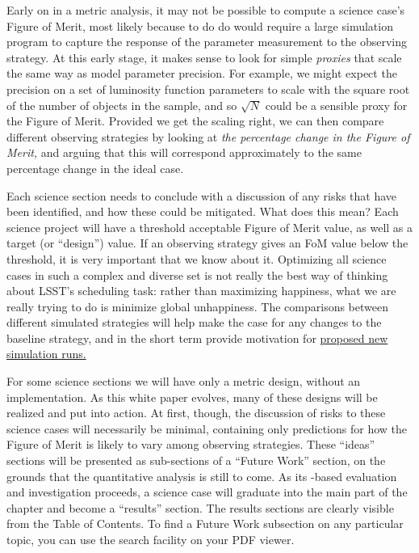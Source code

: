 Early on in a metric analysis, it may not be possible to compute a
science case's Figure of Merit, most likely because to do do would
require a large simulation program to capture the response of the
parameter measurement to the observing strategy. At this early stage, it
makes sense to look for simple {\it proxies} that scale the same way as
model parameter precision. For example, we might expect the precision on
a set of luminosity function  parameters to scale with the square root
of the number of objects in the sample, and so $\sqrt{N}$ could be a
sensible proxy for the Figure of Merit. Provided we get the scaling
right, we can then compare different observing strategies by looking  at
{\it the percentage change in the Figure of Merit,} and arguing that
this will correspond approximately to the same percentage change in the
ideal case.

Each science section needs to conclude with a discussion of any risks
that have been identified, and how these could be mitigated. What does
this mean? Each science project will have a threshold acceptable
Figure of Merit value, as well as a target (or ``design'') value.  If
an observing strategy gives an FoM value below the threshold, it
is very important that we know about it.  Optimizing all science cases
in such a complex and diverse set is not really the best way of
thinking about LSST's scheduling task: rather than maximizing
happiness, what we are really trying to do is minimize global
unhappiness.
The comparisons between different simulated strategies will help make
the case for any changes to the baseline strategy, and in the short term
provide motivation for
\href{https://github.com/LSSTScienceCollaborations/ObservingStrategy/blob/master/opsim/README.md}{proposed
new \OpSim simulation runs.}

For some science sections we will have only a metric design, without an
implementation. As this white paper  evolves, many of these designs will
be realized and put into action. At first, though, the discussion of
risks to these science cases will necessarily be minimal, containing
only predictions for how the Figure of Merit is likely to vary among
observing strategies. These ``ideas'' sections will be presented as
sub-sections of a ``Future Work'' section, on the grounds that the
quantitative analysis is still to come. As its \MAF-based evaluation and
investigation proceeds, a science case will graduate into the main
part of the chapter and become a ``results'' section. The results
sections are clearly visible from the Table of
Contents. To find a Future Work subsection on any particular topic,
you can use the search facility on your PDF viewer.

